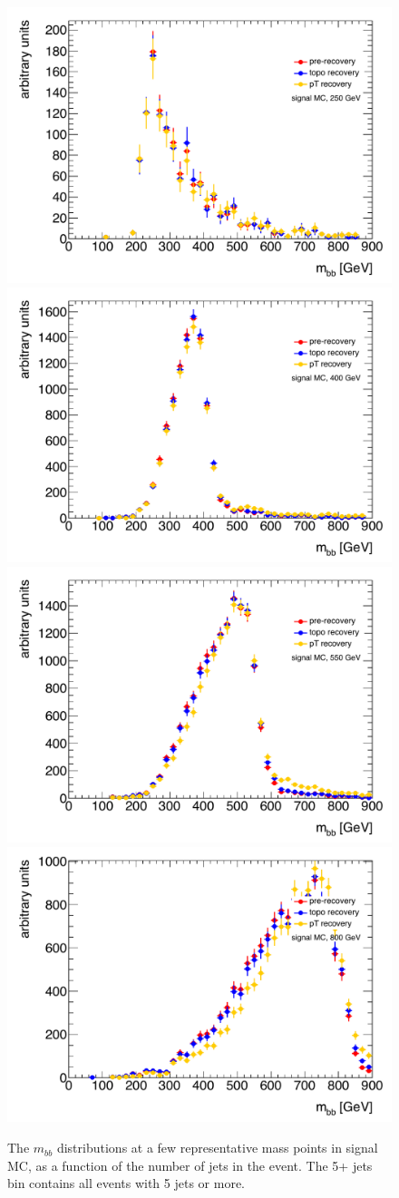 \begin{figure}[hbt]
  \includegraphics[width=0.45\linewidth]{SignalKin/fsr_recovery_bAbb_250.pdf}
  \includegraphics[width=0.45\linewidth]{SignalKin/fsr_recovery_bAbb_400.pdf}
\newline
  \includegraphics[width=0.45\linewidth]{SignalKin/fsr_recovery_bAbb_550.pdf}
  \includegraphics[width=0.45\linewidth]{SignalKin/fsr_recovery_bAbb_800.pdf}
  \label{fig:mbb_njets_signal}
  \caption{The $m_{bb}$ distributions at a few representative mass points in signal MC, as a function of the number of jets in the event.  
    The 5+ jets bin contains all events with 5 jets or more.}
\end{figure}
